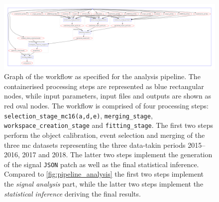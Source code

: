  \begin{figure}
	\centering\includegraphics[width=\textwidth]{yadage_workflow_instance}
	\caption{Graph of the workflow as specified for the analysis pipeline. The containerised processing steps are represented as blue rectangular nodes, while input parameters, input files and outputs are shown as red oval nodes. The workflow is comprised of four processing steps: \texttt{selection\_stage\_mc16(a,d,e)}, \texttt{merging\_stage}, \texttt{workspace\_creation\_stage} and \texttt{fitting\_stage}. The first two steps perform the object calibration, event selection and merging of the three \gls{mc} datasets representing the three data-takin periods 2015--2016, 2017 and 2018. The latter two steps implement the generation of the signal \texttt{JSON} patch as well as the final statistical inference. Compared to \cref{fig:pipeline_analysis} the first two steps implement the \textit{signal analysis} part, while the latter two steps implement the \textit{statistical inference} deriving the final results.} 
	\label{fig:recast_workflow}
\end{figure}

